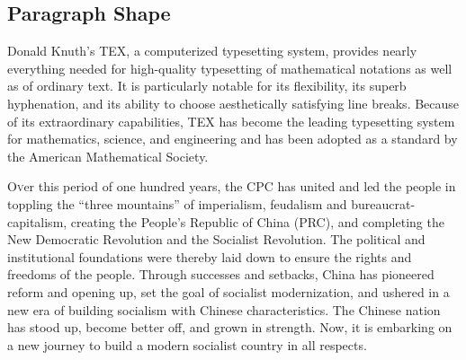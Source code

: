 \documentclass{article}
\begin{document}
        \subsection{Paragraph Shape}
            {
                \hangindent=5pc            %
                Donald Knuth’s TEX, a computerized typesetting system, provides nearly
                everything needed for high-quality typesetting of mathematical notations
                as well as of ordinary text. It is particularly notable for its flexibility, its
                superb hyphenation, and its ability to choose aesthetically satisfying line
                breaks. Because of its extraordinary capabilities, TEX has become the
                leading typesetting system for mathematics, science, and engineering and
                has been adopted as a standard by the American Mathematical Society. 
            }\par
            {
                \lettrine{O}ver this period of one hundred years, the CPC has united and 
                led the people in toppling the “three mountains” of imperialism, feudalism 
                and bureaucrat-capitalism, creating the People’s Republic of China (PRC), and 
                completing the New Democratic Revolution and the Socialist Revolution. The 
                political and institutional foundations were thereby laid down to ensure 
                the rights and freedoms of the people. Through successes and setbacks, 
                China has pioneered reform and opening up, set the goal of socialist modernization, 
                and ushered in a new era of building socialism with Chinese characteristics. 
                The Chinese nation has stood up, become better off, and grown in strength. 
                Now, it is embarking on a new journey to build a modern socialist country in all respects.
            }\par
\end{document}
